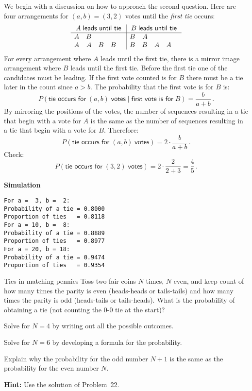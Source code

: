 We begin with a discussion on how to approach the second question. Here are four arrangements for $(a,b)=(3,2)$ votes until the \emph{first tie} occurs:
\[
\begin{array}{rrrrr|rrrrr}
\multicolumn{5}{c|}{A \;\textsf{leads until tie}} &
\multicolumn{5}{c}{B \;\textsf{leads until tie}}\\\hline
A & B &&& &B & A & & &\\
A & A & B & B && B & B & A & A&\\
\end{array}
\]
For every arrangement where $A$ leads until the first tie, there is a mirror image arrangement where $B$ leads until the first tie. Before the first tie one of the candidates must be leading. If the first vote counted is for $B$ there must be a tie later in the count since $a>b$. The probability that the first vote is for $B$ is:
\[
P(\textsf{tie occurs for}\;(a,b)\;\textsf{votes} \;|\; \textsf{first vote is for}\;B)=\frac{b}{a+b}\,.
\]
By mirroring the positions of the votes, the number of sequences resulting in a tie that begin with a vote for $A$ is the same as the number of sequences resulting in a tie that begin with a vote for $B$. Therefore:
\[
P(\textsf{tie occurs for}\;(a,b)\;\textsf{votes})=2\cdot\frac{b}{a+b}\,.
\]
Check:
\[
P(\textsf{tie occurs for}\;(3,2)\;\textsf{votes})=2\cdot\frac{2}{2+3}=\frac{4}{5}\,.
\]

\textbf{Simulation}
\begin{verbatim}
For a =  3, b =  2:
Probability of a tie = 0.8000
Proportion of ties   = 0.8118
For a = 10, b =  8:
Probability of a tie = 0.8889
Proportion of ties   = 0.8977
For a = 20, b = 18:
Probability of a tie = 0.9474
Proportion of ties   = 0.9354
\end{verbatim}



\begin{prob}{Ties in matching pennies}
Toss two fair coins $N$ times, $N$ even, and keep count of how many times the parity is even (heads-heads or tails-tails) and how many times the parity is odd (heads-tails or tails-heads). What is the probability of obtaining a tie (not counting the $0$-$0$ tie at the start)?

 Solve for $N=4$ by writing out all the possible outcomes.

 Solve for $N=6$ by developing a formula for the probability.


 Explain why the probability for the odd number $N+1$ is the same as the probability for the even number $N$.

\textbf{Hint:} Use the solution of Problem~22.
\end{prob}

